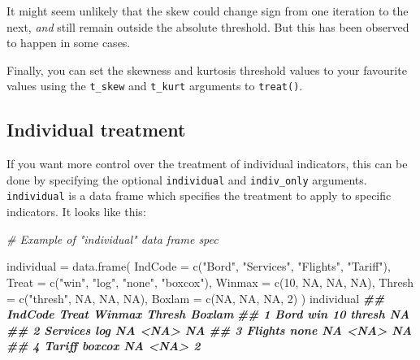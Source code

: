\documentclass[
]{book}
\newenvironment{Shaded}{\begin{snugshade}}{\end{snugshade}}
\newcommand{\AttributeTok}[1]{\textcolor[rgb]{0.77,0.63,0.00}{#1}}
\newcommand{\CommentTok}[1]{\textcolor[rgb]{0.56,0.35,0.01}{\textit{#1}}}
\newcommand{\ConstantTok}[1]{\textcolor[rgb]{0.00,0.00,0.00}{#1}}
\newcommand{\DecValTok}[1]{\textcolor[rgb]{0.00,0.00,0.81}{#1}}
\newcommand{\DocumentationTok}[1]{\textcolor[rgb]{0.56,0.35,0.01}{\textbf{\textit{#1}}}}
\newcommand{\FunctionTok}[1]{\textcolor[rgb]{0.00,0.00,0.00}{#1}}
\newcommand{\NormalTok}[1]{#1}
\newcommand{\OtherTok}[1]{\textcolor[rgb]{0.56,0.35,0.01}{#1}}
\newcommand{\StringTok}[1]{\textcolor[rgb]{0.31,0.60,0.02}{#1}}
\begin{document}
It might seem unlikely that the skew could change sign from one iteration to the next, \emph{and} still remain outside the absolute threshold. But this has been observed to happen in some cases.

Finally, you can set the skewness and kurtosis threshold values to your favourite values using the \texttt{t\_skew} and \texttt{t\_kurt} arguments to \texttt{treat()}.

\hypertarget{individual-treatment}{%
\subsection{Individual treatment}\label{individual-treatment}}

If you want more control over the treatment of individual indicators, this can be done by specifying the optional \texttt{individual} and \texttt{indiv\_only} arguments. \texttt{individual} is a data frame which specifies the treatment to apply to specific indicators. It looks like this:

\begin{Shaded}
\begin{Highlighting}[]
\CommentTok{\# Example of "individual" data frame spec}

\NormalTok{individual }\OtherTok{=} \FunctionTok{data.frame}\NormalTok{(}
  \AttributeTok{IndCode =} \FunctionTok{c}\NormalTok{(}\StringTok{"Bord"}\NormalTok{, }\StringTok{"Services"}\NormalTok{, }\StringTok{"Flights"}\NormalTok{, }\StringTok{"Tariff"}\NormalTok{),}
  \AttributeTok{Treat =} \FunctionTok{c}\NormalTok{(}\StringTok{"win"}\NormalTok{, }\StringTok{"log"}\NormalTok{, }\StringTok{"none"}\NormalTok{, }\StringTok{"boxcox"}\NormalTok{),}
  \AttributeTok{Winmax =} \FunctionTok{c}\NormalTok{(}\DecValTok{10}\NormalTok{, }\ConstantTok{NA}\NormalTok{, }\ConstantTok{NA}\NormalTok{, }\ConstantTok{NA}\NormalTok{),}
  \AttributeTok{Thresh =} \FunctionTok{c}\NormalTok{(}\StringTok{"thresh"}\NormalTok{, }\ConstantTok{NA}\NormalTok{, }\ConstantTok{NA}\NormalTok{, }\ConstantTok{NA}\NormalTok{),}
  \AttributeTok{Boxlam =} \FunctionTok{c}\NormalTok{(}\ConstantTok{NA}\NormalTok{, }\ConstantTok{NA}\NormalTok{, }\ConstantTok{NA}\NormalTok{, }\DecValTok{2}\NormalTok{)}
\NormalTok{)}
\NormalTok{individual}
\DocumentationTok{\#\#    IndCode  Treat Winmax Thresh Boxlam}
\DocumentationTok{\#\# 1     Bord    win     10 thresh     NA}
\DocumentationTok{\#\# 2 Services    log     NA   \textless{}NA\textgreater{}     NA}
\DocumentationTok{\#\# 3  Flights   none     NA   \textless{}NA\textgreater{}     NA}
\DocumentationTok{\#\# 4   Tariff boxcox     NA   \textless{}NA\textgreater{}      2}
\end{Highlighting}
\end{Shaded}
\end{document}
